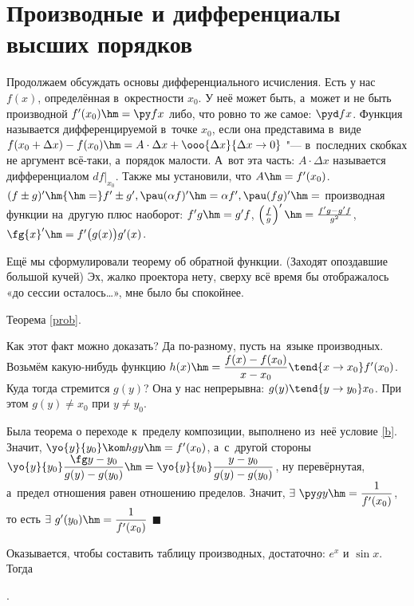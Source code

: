 \documentclass[a4paper,10pt,twoside]{article}
\newenvironment{Proof}
       {\par\noindent{\textbf{Доказательство.}}}
       {\hfill$\scriptstyle\blacksquare$}
\let\AVsection\section{}
\renewcommand\section{\newpage\scol\AVsection}
\newcommand{\scol}{  \renewcommand{\headrulewidth}{0.5pt}\fancyhead[RE,LO]{\thesection{} \leftmark} \fancyhead[LE,RO]{\thepage}}
\begin{document}
\section{Производные и дифференциалы высших порядков}

Продолжаем обсуждать основы дифференциального исчисления. Есть у нас $f(x)$, определённая в~окрестности $x_0$. У неё может быть, а~может и не быть производной $f'(x_0)\hm=\py fx$ либо, что ровно то же самое: $\pyd fx$. Функция называется дифференцируемой в~точке $x_0$, если она представима в~виде
$f(x_0+\Delta x)-f(x_0)\hm=A\cdot\Delta x+\ooo{\Delta x}{\Delta x\to 0}$ "--- в~последних скобках не аргумент всё-таки, а~порядок малости.
А~вот эта часть: $A\cdot\Delta x$ называется дифференциалом $df\big|_{x_0}$. Также мы установили, что $A\hm=f'(x_0)$. $(f\pm g)'\hm{\hm=}f'\pm g',\pau
(\alpha f)'\hm=\alpha f',\pau (fg)'\hm=$ производная функции на~другую плюс наоборот: $f'g\hm=g'f$, $\left(\frac fg\right)'\hm=\frac{f'g-g'f}{g^2}$,
$\fg{x}'\hm=f'\big(g(x)\big)g'(x)$.

Ещё мы сформулировали теорему об обратной функции. (Заходят опоздавшие большой кучей) Эх, жалко проектора нету, сверху всё время бы отображалось «до сессии осталось\ldots», мне было бы спокойнее.

Теорема \ref{prob}.

\begin{Proof}
    Как этот факт можно доказать? Да по-разному, пусть на~языке производных. Возьмём какую-нибудь функцию
    $h(x)\hm=\dfrac{f(x)-f(x_0)}{x-x_0}
    \tend{x\to x_0}f'(x_0)$.
     Куда тогда стремится $g(y)$?
      Она у нас непрерывна: $g(y)\tend{y\to y_0}x_0$.
       При этом $g(y)\neq x_0$ при
    $y\neq y_0$.

    Была теорема о переходе к~пределу композиции, выполнено из~неё условие \ref{b}.
     Значит, $\yo{y}{y_0}
     \kom hgy\hm=f'(x_0)$, а~с~другой стороны
    $\yo{y}{y_0}
    \dfrac{\fg y-y_0}{g(y)-g(y_0)}
    \hm=\yo{y}{y_0}
    \dfrac{y-y_0}
    {g(y)-g(y_0)}$, ну перевёрнутая, а~предел отношения равен отношению пределов. Значит, $\exists\  \py gy\hm=\dfrac{1}{f'(x_0)}$, то есть $\exists\  g'(y_0)\hm=\dfrac1{f'(x_0)}$
\end{Proof}

Оказывается, чтобы составить таблицу производных, достаточно: $e^x$ и $\sin x$. Тогда

.
\end{document}
